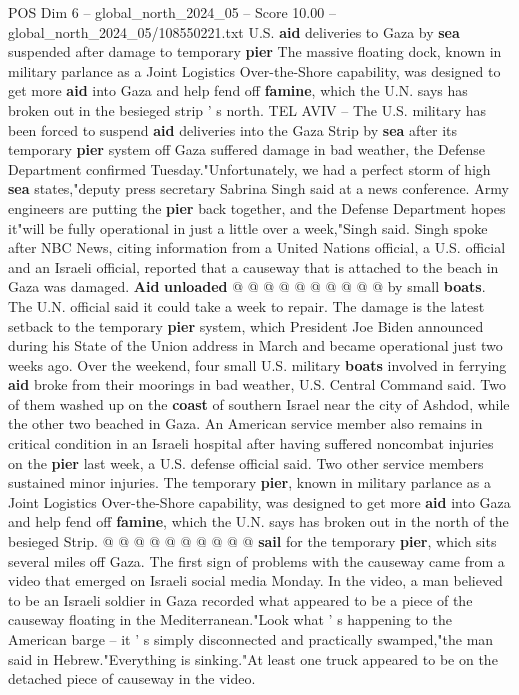 \begin{textsample}{POS Dim 6 – global\_north\_2024\_05 – Score 10.00 – global\_north\_2024\_05/108550221.txt}  \label{ex:f6_pos_147}
U.S. \textbf{aid} deliveries to Gaza by \textbf{sea} suspended after damage to temporary \textbf{pier} The massive floating dock, known in military parlance as a Joint Logistics Over-the-Shore capability, was designed to get more \textbf{aid} into Gaza and help fend off \textbf{famine}, which the U.N. says has broken out in the besieged strip ' s north.
TEL AVIV -- The U.S. military has been forced to suspend \textbf{aid} deliveries into the Gaza Strip by \textbf{sea} after its temporary \textbf{pier} system off Gaza suffered damage in bad weather, the Defense Department confirmed Tuesday."Unfortunately, we had a perfect storm of high \textbf{sea} states,"deputy press secretary Sabrina Singh said at a news conference.
Army engineers are putting the \textbf{pier} back together, and the Defense Department hopes it"will be fully operational in just a little over a week,"Singh said.
Singh spoke after NBC News, citing information from a United Nations official, a U.S. official and an Israeli official, reported that a causeway that is attached to the beach in Gaza was damaged. \textbf{Aid} \textbf{unloaded} @ @ @ @ @ @ @ @ @ @ by small \textbf{boats}.
The U.N. official said it could take a week to repair.
The damage is the latest setback to the temporary \textbf{pier} system, which President Joe Biden announced during his State of the Union address in March and became operational just two weeks ago.
Over the weekend, four small U.S. military \textbf{boats} involved in ferrying \textbf{aid} broke from their moorings in bad weather, U.S.
Central Command said.
Two of them washed up on the \textbf{coast} of southern Israel near the city of Ashdod, while the other two beached in Gaza.
An American service member also remains in critical condition in an Israeli hospital after having suffered noncombat injuries on the \textbf{pier} last week, a U.S. defense official said.
Two other service members sustained minor injuries.
The temporary \textbf{pier}, known in military parlance as a Joint Logistics Over-the-Shore capability, was designed to get more \textbf{aid} into Gaza and help fend off \textbf{famine}, which the U.N. says has broken out in the north of the besieged Strip. @ @ @ @ @ @ @ @ @ @ \textbf{sail} for the temporary \textbf{pier}, which sits several miles off Gaza.
The first sign of problems with the causeway came from a video that emerged on Israeli social media Monday.
In the video, a man believed to be an Israeli soldier in Gaza recorded what appeared to be a piece of the causeway floating in the Mediterranean."Look what ' s happening to the American barge -- it ' s simply disconnected and practically swamped,"the man said in Hebrew."Everything is sinking."At least one truck appeared to be on the detached piece of causeway in the video.

\end{textsample}
